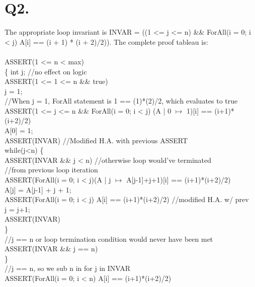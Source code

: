 \documentclass{article}
\begin{document}
	\section*{Q2.}
	The appropriate loop invariant is {\selectfont INVAR = ((1 <= j <= n) \&\& ForAll(i = 0; i < j) A[i] == (i + 1) * (i + 2)/2))}. The complete proof tableau is:\\\\
	{\selectfont
ASSERT(1 <= n < max)\\
\{ int j; //no effect on logic\\
ASSERT(1 <= 1 <= n \&\& true)\\
\hphantom{aaaa}j = 1;\\
//When j = 1, ForAll statement is 1 == (1)*(2)/2, which evaluates to true\\
ASSERT(1 <= j <= n \&\& ForAll(i = 0; i < j) (A | 0 $\mapsto$ 1)[i] == (i+1)*(i+2)/2)\\
\hphantom{aaaa}A[0] = 1;\\
ASSERT(INVAR) //Modified H.A. with previous ASSERT\\
\hphantom{aaaa}while(j<n) \{\\
ASSERT(INVAR \&\& j < n) //otherwise loop would've terminated\\
//from previous loop iteration\\
ASSERT(ForAll(i = 0; i < j)(A | j $\mapsto$ A[j-1]+j+1)[i] == (i+1)*(i+2)/2)\\
\hphantom{aaaaaaaa}A[j] = A[j-1] + j + 1;\\
ASSERT(ForAll(i = 0; i < j) A[i]  == (i+1)*(i+2)/2) //modified H.A. w/ prev\\
\hphantom{aaaaaaaa}j = j+1;\\
ASSERT(INVAR)\\
\hphantom{aaaa}\}\\
//j == n or loop termination condition would never have been met\\
ASSERT(INVAR \&\& j == n)\\ 
\}\\
//j == n, so we sub n in for j in INVAR\\
ASSERT(ForAll(i = 0; i < n) A[i] == (i+1)*(i+2)/2)
	}
	
\end{document}
